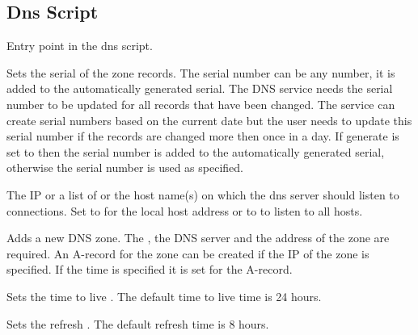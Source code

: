 \subsection{Dns Script}



Entry point in the dns script.


Sets the serial  of the zone records.
The serial number can be any number, it is added to the automatically
generated serial. The DNS service needs the serial number to be updated
for all records that have been changed. The service can create serial
numbers based on the current date but the user needs to update this
serial number if the records are changed more then once in a day.
If generate is set to  then the serial number is added to
the automatically generated serial, otherwise the serial number is used 
as specified.

\TheStatement*[dns!bind]{bind [address: [local|all|\Arg{address}] [, addresses: \Arg{addresses}]}

The IP  or a list of  or the host name(s) 
on which the dns server should listen to connections. Set to 
for the local host address  or to  to listen to all
hosts.


Adds a new DNS zone. The , the  DNS server and 
the  address of the zone are required. An A-record for the zone
can be created if the IP  of the zone is specified. If the
 time is specified it is set for the A-record.


Sets the time to live . The default time to live time is 24 hours.


Sets the refresh . The default refresh time is 8 hours.

